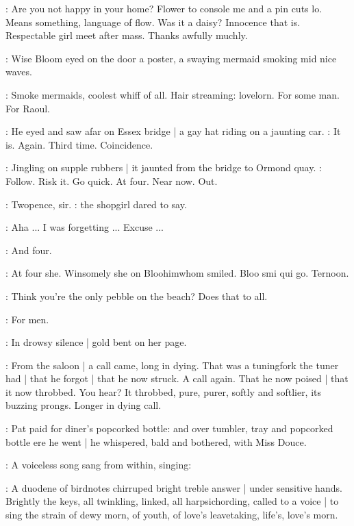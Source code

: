 \BloomInt:
Are you not happy in your home?
Flower to console me and a pin cuts lo.
Means something, language of flow.
Was it a daisy?
Innocence that is.
Respectable girl meet after mass.
Thanks awfully muchly.

:
Wise Bloom eyed on the door a poster,
a swaying mermaid smoking mid nice waves.

\BloomInt:
Smoke mermaids, coolest whiff of all.
Hair streaming: lovelorn.
For some man.
For Raoul.

:
He eyed and saw afar on Essex bridge |
a gay hat riding on a jaunting car.
\BloomInt:
It is.
Again.
Third time.
Coincidence.

:
Jingling on supple rubbers |
it jaunted from the bridge to Ormond quay.
\BloomInt:
Follow.
Risk it.
Go quick.
At four.
Near now.
Out.

\shopgirl:
Twopence, sir.
:
the shopgirl dared to say.

\Bloom:
Aha ...
I was forgetting ...
Excuse ...

\shopgirl:
And four.

\BloomInt:
At four she.
Winsomely she on Bloohimwhom smiled.
Bloo smi qui go.
Ternoon.

\BloomInt:
Think you're the only pebble on the beach?
Does that to all.

\BloomInt:
For men.

:
In drowsy silence |
gold bent on her page.

:
From the saloon |
a call came,
long in dying.
That was a tuningfork the tuner had |
that he forgot |
that he now struck.
A call again.
That he now poised |
that it now throbbed.
You hear?
It throbbed,
pure, purer,
softly and softlier,
its buzzing prongs.
Longer in dying call.

:
Pat paid for diner's popcorked bottle:
and over tumbler, tray and popcorked bottle ere he went |
he whispered, bald and bothered,
with Miss Douce.


:
A voiceless song sang from within, singing:


:
A duodene of birdnotes chirruped bright treble answer |
under sensitive hands.
Brightly the keys,
all twinkling,
linked,
all harpsichording,
called to a voice |
to sing the strain of dewy morn,
of youth,
of love's leavetaking,
life's,
love's morn.

